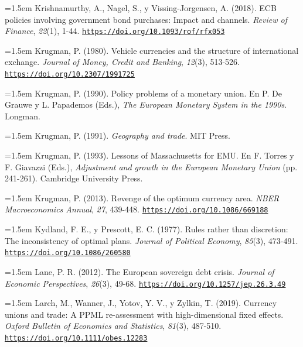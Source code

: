 \documentclass[10pt,a4paper]{article}
\begin{document}
\noindent\hangindent=1.5em Krishnamurthy, A., Nagel, S., y Vissing-Jorgensen, A. (2018). ECB policies involving government bond purchases: Impact and channels. \textit{Review of Finance}, \textit{22}(1), 1-44. \href{https://doi.org/10.1093/rof/rfx053}{\nolinkurl{https://doi.org/10.1093/rof/rfx053}}

\noindent\hangindent=1.5em Krugman, P. (1980). Vehicle currencies and the structure of international exchange. \textit{Journal of Money, Credit and Banking}, \textit{12}(3), 513-526. \href{https://doi.org/10.2307/1991725}{\nolinkurl{https://doi.org/10.2307/1991725}}

\noindent\hangindent=1.5em Krugman, P. (1990). Policy problems of a monetary union. En P. De Grauwe y L. Papademos (Eds.), \textit{The European Monetary System in the 1990s}. Longman.

\noindent\hangindent=1.5em Krugman, P. (1991). \textit{Geography and trade}. MIT Press.

\noindent\hangindent=1.5em Krugman, P. (1993). Lessons of Massachusetts for EMU. En F. Torres y F. Giavazzi (Eds.), \textit{Adjustment and growth in the European Monetary Union} (pp. 241-261). Cambridge University Press.

\noindent\hangindent=1.5em Krugman, P. (2013). Revenge of the optimum currency area. \textit{NBER Macroeconomics Annual}, \textit{27}, 439-448. \href{https://doi.org/10.1086/669188}{\nolinkurl{https://doi.org/10.1086/669188}}

\noindent\hangindent=1.5em Kydland, F. E., y Prescott, E. C. (1977). Rules rather than discretion: The inconsistency of optimal plans. \textit{Journal of Political Economy}, \textit{85}(3), 473-491. \href{https://doi.org/10.1086/260580}{\nolinkurl{https://doi.org/10.1086/260580}}

\noindent\hangindent=1.5em Lane, P. R. (2012). The European sovereign debt crisis. \textit{Journal of Economic Perspectives}, \textit{26}(3), 49-68. \href{https://doi.org/10.1257/jep.26.3.49}{\nolinkurl{https://doi.org/10.1257/jep.26.3.49}}

\noindent\hangindent=1.5em Larch, M., Wanner, J., Yotov, Y. V., y Zylkin, T. (2019). Currency unions and trade: A PPML re-assessment with high-dimensional fixed effects. \textit{Oxford Bulletin of Economics and Statistics}, \textit{81}(3), 487-510. \href{https://doi.org/10.1111/obes.12283}{\nolinkurl{https://doi.org/10.1111/obes.12283}}
\end{document}
